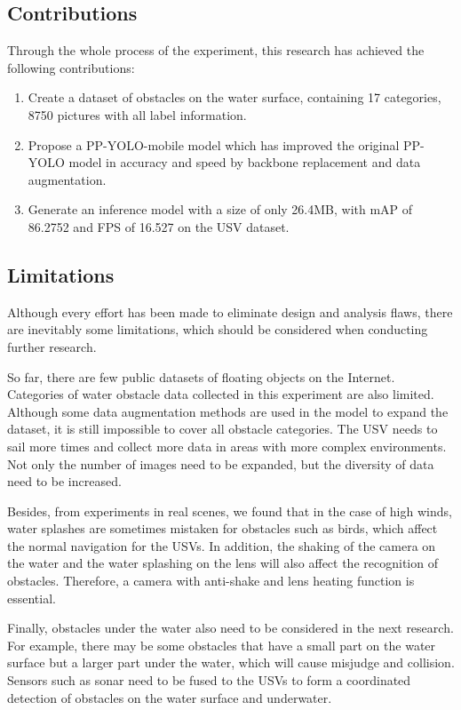 \documentclass[sensors,article,submit,moreauthors,pdftex]{Definitions/mdpi}
\begin{document}
\begin{paracol}{2}
\subsection{Contributions}
Through the whole process of the experiment, this research has achieved the following contributions:

\begin{enumerate}

\item Create a dataset of obstacles on the water surface, containing 17 categories, 8750 pictures with all label information.
\item Propose a PP-YOLO-mobile model which has improved the original PP-YOLO model in accuracy and speed by backbone replacement and data augmentation.
\item Generate an inference model with a size of only 26.4MB, with mAP of 86.2752 and FPS of 16.527 on the USV dataset.

\end{enumerate}

\subsection{Limitations}
Although every effort has been made to eliminate design and analysis flaws, there are inevitably some limitations, which should be considered when conducting further research.

So far, there are few public datasets of floating objects on the Internet. Categories of water obstacle data collected in this experiment are also limited. Although some data augmentation methods are used in the model to expand the dataset, it is still impossible to cover all obstacle categories. The USV needs to sail more times and collect more data in areas with more complex environments. Not only the number of images need to be expanded, but the diversity of data need to be increased.

Besides, from experiments in real scenes, we found that in the case of high winds, water splashes are sometimes mistaken for obstacles such as birds, which affect the normal navigation for the USVs. In addition, the shaking of the camera on the water and the water splashing on the lens will also affect the recognition of obstacles. Therefore, a camera with anti-shake and lens heating function is essential.

Finally, obstacles under the water also need to be considered in the next research. For example, there may be some obstacles that have a small part on the water surface but a larger part under the water, which will cause misjudge and collision. Sensors such as sonar need to be fused to the USVs to form a coordinated detection of obstacles on the water surface and underwater.




\end{paracol}
\end{document}
